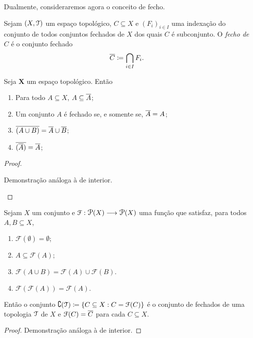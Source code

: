 	Dualmente, consideraremos agora o conceito de fecho.

\begin{defi}
	Sejam $(X,\mathcal{T})$ um espaço topológico, $C \subseteq X$ e $(F_i)_{i \in I}$ uma indexação do conjunto de todos conjuntos fechados de $X$ dos quais $C$ é subconjunto. O \emph{fecho de $C$} é o conjunto fechado
	\begin{equation*}
	\fec{C} \coloneqq \bigcap_{i \in I} F_i.
	\end{equation*}
\end{defi}

\begin{prop}
	Seja $\bm X$ um espaço topológico. Então
	\begin{enumerate}	
	\item Para todo $A \subseteq X$, $A \subseteq \overline{A}$;
	\item Um conjunto $A$ é fechado se, e somente se, $\overline{A}=A$;
	\item $\overline{(A \cup B)} = \overline{A} \cup \overline{B}$;
	\item $\overline{(\overline{A})} = \overline{A}$;
	\end{enumerate}
\end{prop}
\begin{proof}
	\begin{enumerate}
	Demonstração análoga à de interior.
	\end{enumerate}
\end{proof}

\begin{prop}
	Sejam $X$ um conjunto e $\mathcal F: \p(X) \to \p(X)$ uma função que satisfaz, para todos $A,B \subseteq X$,
	\begin{enumerate}
	\item $\mathcal F(\emptyset) = \emptyset$;
	\item $A \subseteq \mathcal F(A)$;
	\item $\mathcal F(A \cup B) = \mathcal F(A) \cup \mathcal F(B)$.
	\item $\mathcal F(\mathcal F(A)) = \mathcal F(A)$.
	\end{enumerate}
	
Então o conjunto $\complement(\topo) \coloneqq \{C \subseteq X : C = \mathcal F(C)\}$ é o conjunto de fechados de uma topologia $\mathcal{T}$ de $X$ e $\mathcal F(C) = \overline{C}$ para cada $C \subseteq X$.
\end{prop}
\begin{proof}
	Demonstração análoga à de interior.
\end{proof}



